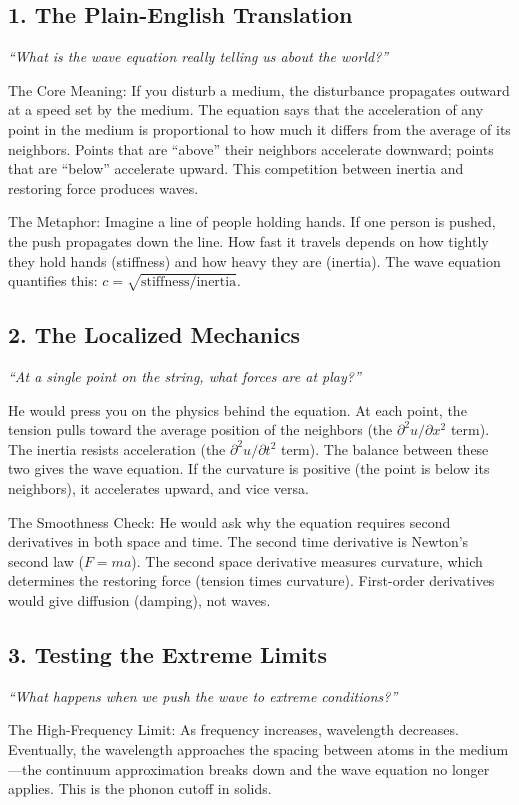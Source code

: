 \subsection*{1. The Plain-English Translation}
\textit{``What is the wave equation really telling us about the world?''}

The Core Meaning: If you disturb a medium, the disturbance propagates outward at a speed set by the medium. The equation says that the acceleration of any point in the medium is proportional to how much it differs from the average of its neighbors. Points that are ``above'' their neighbors accelerate downward; points that are ``below'' accelerate upward. This competition between inertia and restoring force produces waves.

The Metaphor: Imagine a line of people holding hands. If one person is pushed, the push propagates down the line. How fast it travels depends on how tightly they hold hands (stiffness) and how heavy they are (inertia). The wave equation quantifies this: $c = \sqrt{\text{stiffness}/\text{inertia}}$.

\subsection*{2. The Localized Mechanics}
\textit{``At a single point on the string, what forces are at play?''}

He would press you on the physics behind the equation. At each point, the tension pulls toward the average position of the neighbors (the $\partial^2 u/\partial x^2$ term). The inertia resists acceleration (the $\partial^2 u/\partial t^2$ term). The balance between these two gives the wave equation. If the curvature is positive (the point is below its neighbors), it accelerates upward, and vice versa.

The Smoothness Check: He would ask why the equation requires second derivatives in both space and time. The second time derivative is Newton's second law ($F = ma$). The second space derivative measures curvature, which determines the restoring force (tension times curvature). First-order derivatives would give diffusion (damping), not waves.

\subsection*{3. Testing the Extreme Limits}
\textit{``What happens when we push the wave to extreme conditions?''}

The High-Frequency Limit: As frequency increases, wavelength decreases. Eventually, the wavelength approaches the spacing between atoms in the medium---the continuum approximation breaks down and the wave equation no longer applies. This is the phonon cutoff in solids.

